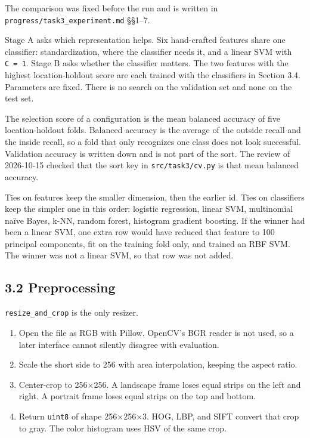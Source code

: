 \documentclass[11pt,a4paper]{article}
\providecommand{\tightlist}{%
  \setlength{\itemsep}{0pt}\setlength{\parskip}{0pt}}
\newcounter{none}
\begin{document}
The comparison was fixed before the run and is written in \texttt{progress/\allowbreak{}task3\_\allowbreak{}experiment.md} §§1--7.

Stage A asks which representation helps. Six hand-crafted features share one classifier: standardization, where the classifier needs it, and a linear SVM with \texttt{C\ =\ 1}. Stage B asks whether the classifier matters. The two features with the highest location-holdout score are each trained with the classifiers in Section 3.4. Parameters are fixed. There is no search on the validation set and none on the test set.

The selection score of a configuration is the mean balanced accuracy of five location-holdout folds. Balanced accuracy is the average of the outside recall and the inside recall, so a fold that only recognizes one class does not look successful. Validation accuracy is written down and is not part of the sort. The review of 2026-10-15 checked that the sort key in \texttt{src/\allowbreak{}task3/\allowbreak{}cv.py} is that mean balanced accuracy.

Ties on features keep the smaller dimension, then the earlier id. Ties on classifiers keep the simpler one in this order: logistic regression, linear SVM, multinomial naïve Bayes, k-NN, random forest, histogram gradient boosting. If the winner had been a linear SVM, one extra row would have reduced that feature to 100 principal components, fit on the training fold only, and trained an RBF SVM. The winner was not a linear SVM, so that row was not added.

\subsection{3.2 Preprocessing}\label{preprocessing}

\texttt{resize\_\allowbreak{}and\_\allowbreak{}crop} is the only resizer.

\begin{enumerate}
\def\labelenumi{\arabic{enumi}.}
\tightlist
\item
  Open the file as RGB with Pillow. OpenCV's BGR reader is not used, so a later interface cannot silently disagree with evaluation.
\item
  Scale the short side to 256 with area interpolation, keeping the aspect ratio.
\item
  Center-crop to 256×256. A landscape frame loses equal strips on the left and right. A portrait frame loses equal strips on the top and bottom.
\item
  Return \texttt{uint8} of shape 256×256×3. HOG, LBP, and SIFT convert that crop to gray. The color histogram uses HSV of the same crop.
\end{enumerate}
\end{document}
